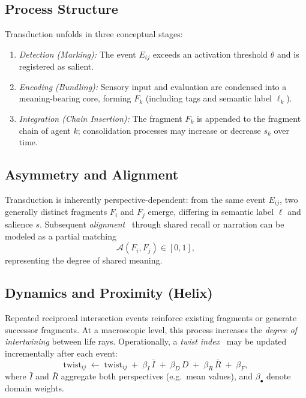 \documentclass[12pt,a4paper]{article}
\begin{document}
\medskip
\subsection{Process Structure}
Transduction unfolds in three conceptual stages:
\begin{enumerate}
    \item \emph{Detection (Marking):}
    The event $E_{ij}$ exceeds an activation threshold $\theta$
    and is registered as salient.
    \item \emph{Encoding (Bundling):}
    Sensory input and evaluation are condensed into a
    meaning-bearing core, forming $F_k$
    (including tags and semantic label $\ell_k$).
    \item \emph{Integration (Chain Insertion):}
    The fragment $F_k$ is appended to the fragment chain of
    agent $k$; consolidation processes may increase or decrease
    $s_k$ over time.
\end{enumerate}

\medskip
\subsection{Asymmetry and Alignment}
Transduction is inherently perspective-dependent:
from the same event $E_{ij}$, two generally distinct fragments
$F_i$ and $F_j$ emerge, differing in semantic label $\ell$
and salience $s$.
Subsequent \emph{alignment}~
 through shared recall or narration
can be modeled as a partial matching
\[
\mathcal{A}(F_i,F_j)\in[0,1],
\]
representing the degree of shared meaning.

\medskip
\subsection{Dynamics and Proximity (Helix)}
Repeated reciprocal intersection events reinforce existing
fragments or generate successor fragments.
At a macroscopic level, this process increases the
\emph{degree of intertwining} between life rays.
Operationally, a \emph{twist index}~ may be updated incrementally
after each event:
\[
\text{twist}_{ij}
\;\leftarrow\;
\text{twist}_{ij}
\;+\;
\beta_I\,\bar I
\;+\;
\beta_D\,D
\;+\;
\beta_R\,\bar R
\;+\;
\beta_F,
\]
where $\bar I$ and $\bar R$ aggregate both perspectives
(e.g.\ mean values), and $\beta_\bullet$ denote domain weights.
\end{document}
